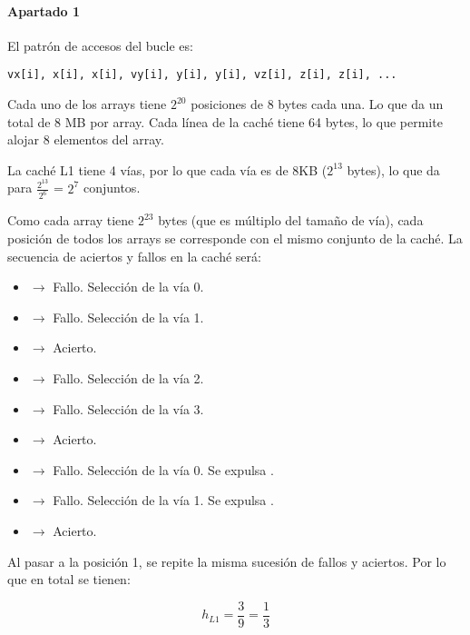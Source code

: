 \begin{acsolution}\end{acsolution}

\paragraph{Apartado 1}

El patrón de accesos del bucle es:

\begin{lstlisting}
vx[i], x[i], x[i], vy[i], y[i], y[i], vz[i], z[i], z[i], ...
\end{lstlisting}

Cada uno de los arrays tiene $2^{20}$ posiciones de 8 bytes cada una. Lo que da un
total de 8 MB por array. Cada línea de la caché tiene 64 bytes, lo que permite
alojar 8 elementos del array.

La caché L1 tiene 4 vías, por lo que cada vía es de 8KB ($2^{13}$ bytes), lo
que da para $\frac{2^{13}}{2^6}$ = $2^7$ conjuntos.

Como cada array tiene $2^{23}$ bytes (que es múltiplo del tamaño de vía), cada
posición  de todos los arrays se corresponde con el mismo conjunto de la
caché. La secuencia de aciertos y fallos en la caché será:

\begin{itemize}
  \item {} $\rightarrow$ Fallo. Selección de la vía 0.
  \item {} $\rightarrow$ Fallo. Selección de la vía 1.
  \item {} $\rightarrow$ Acierto.
  \item {} $\rightarrow$ Fallo. Selección de la vía 2.
  \item {} $\rightarrow$ Fallo. Selección de la vía 3.
  \item {} $\rightarrow$ Acierto.
  \item {} $\rightarrow$ Fallo. Selección de la vía 0. Se expulsa .
  \item {} $\rightarrow$ Fallo. Selección de la vía 1. Se expulsa .
  \item {} $\rightarrow$ Acierto.
\end{itemize}

Al pasar a la posición 1, se repite la misma sucesión de fallos y aciertos. Por
lo que en total se tienen:

\[
h_{L1} = \frac{3}{9} = \frac{1}{3}
\]

